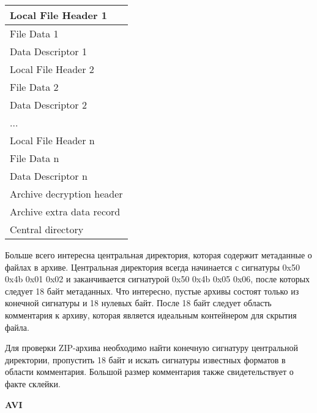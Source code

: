 \begin{table} [htbp]%
  \centering
  \parbox{6cm}{%
    \captiondelim{ } %
    \caption{ }%
    \label{tabl:tab7x4}%
    \begin{SingleSpace}
      \begin{tabular}{|l|}
      \hline
      {Local File Header 1}       \\ \hline
      {File Data 1}               \\ \hline
      {Data Descriptor 1}         \\ \hline
      {Local File Header 2}       \\ \hline
      {File Data 2}               \\ \hline
      {Data Descriptor 2}         \\ \hline
      ...                                             \\ \hline
      {Local File Header n}       \\ \hline
      {File Data n}               \\ \hline
      {Data Descriptor n}         \\ \hline
      {Archive decryption header} \\ \hline
      {Archive extra data record} \\ \hline
      {Central directory}         \\ \hline
      \end{tabular}
    \end{SingleSpace}
    }
\end{table}

Больше всего интересна центральная директория, которая содержит метаданные о
файлах в архиве. Центральная директория всегда начинается с сигнатуры 0x50
0x4b 0x01 0x02 и заканчивается сигнатурой 0x50 0x4b 0x05 0x06, после которых
следует 18 байт метаданных. Что интересно, пустые архивы состоят только из
конечной сигнатуры и 18 нулевых байт. После 18 байт следует область
комментария к архиву, которая является идеальным контейнером для скрытия
файла.

Для проверки ZIP-архива необходимо найти конечную сигнатуру центральной
директории, пропустить 18 байт и искать сигнатуры известных форматов в
области комментария. Большой размер комментария также свидетельствует о факте
склейки.

\textbf{AVI}

